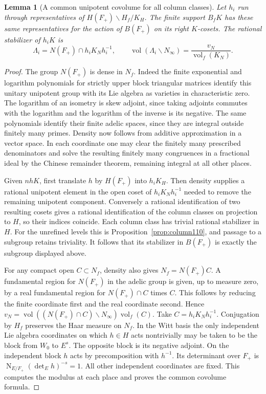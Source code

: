 \documentclass[a4paper,11pt]{article}
\newtheorem{lemma}[proposition]{Lemma}
\theoremstyle{definition}
\theoremstyle{remark}
\numberwithin{equation}{section}
\begin{document}
\begin{lemma}[A common unipotent covolume for all column classes]
\label{lem:covol127}
Let \(h_i\) run through representatives of
\(H(F_+)\backslash H_f/K_H\). The finite support \(B_fK\)
has these same representatives for the action of \(B(F_+)\) on
its right \(K\)-cosets. The rational stabilizer of \(h_iK\) is
\[
       \Lambda_i=N(F_+)\cap h_i K_Nh_i^{-1},
       \qquad
       \operatorname{vol}(\Lambda_i\backslash N_\infty)
              =\frac{v_N}{\operatorname{vol}_f(K_N)} .
\]
\end{lemma}
\begin{proof}
The group \(N(F_+)\) is dense in \(N_f\). Indeed the finite
exponential and logarithm polynomials for strictly upper block
triangular matrices identify this unitary unipotent group with
its Lie algebra as varieties in characteristic zero. The logarithm
of an isometry is skew adjoint, since taking adjoints commutes
with the logarithm and the logarithm of the inverse is its negative.
The same polynomials identify their finite adelic spaces, since they
are integral outside finitely many primes. Density now follows from
additive approximation in a vector space. In each coordinate one
may clear the finitely many prescribed denominators and solve the
resulting finitely many congruences in a fractional ideal by the
Chinese remainder theorem, remaining integral at all other places.

Given \(n hK\), first translate \(h\) by \(H(F_+)\) into \(h_iK_H\).
Then density supplies a rational unipotent element in the open
coset of \(h_iK_Nh_i^{-1}\) needed to remove the remaining
unipotent component. Conversely a rational identification of
two resulting cosets gives a rational identification of the
column classes on projection to \(H\), so their indices coincide.
Each column class has trivial rational stabilizer in \(H\).
For the unrefined levels this is Proposition~\ref{prop:column110},
and passage to a subgroup retains triviality. It follows that its
stabilizer in \(B(F_+)\) is exactly the subgroup displayed above.

For any compact open \(C\subset N_f\), density also gives
\(N_f=N(F_+)C\). A fundamental region for \(N(F_+)\) in the
adelic group is given, up to measure zero, by a real fundamental
region for \(N(F_+)\cap C\) times \(C\). This follows by reducing
the finite coordinate first and the real coordinate second.
Hence \(v_N=\operatorname{vol}((N(F_+)\cap C)\backslash N_\infty)
\operatorname{vol}_f(C)\). Take \(C=h_iK_Nh_i^{-1}\).
Conjugation by \(H_f\) preserves the Haar measure on \(N_f\).
In the Witt basis the only independent Lie algebra coordinates
on which \(h\in H\) acts nontrivially may be taken to be the
block from \(W_0\) to \(E^s\). The opposite block is its negative
adjoint. On the independent block \(h\) acts by precomposition
with \(h^{-1}\). Its determinant over \(F_+\) is
\(\operatorname{N}_{E/F_+}(\det_E h)^{-s}=1\). All other
independent coordinates are fixed. This computes the modulus
at each place and proves the common covolume formula.
\end{proof}
\end{document}

